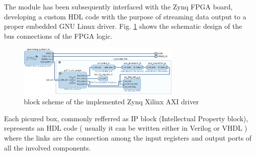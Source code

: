 The module has been subsequently interfaced with the Zynq FPGA board, developing a custom HDL code with the purpose of streaming data output to a proper embedded GNU Linux driver. Fig. \ref{fig:em_channel_hdl} shows the schematic design of the bus connections of the FPGA logic.
\begin{figure}[ht]
\centering
\includegraphics[width=0.7\textwidth]{img/4_EmbeddedML/7.png}
\caption{block scheme of the implemented Zynq Xilinx AXI driver}
\label{fig:em_channel_hdl}
\end{figure}
Each picured box, commonly refferred as IP block (Intellectual Property block), represents an HDL code ( usually it can be written either in Verilog or VHDL ) where the links are the connection among the input registers and output ports of all the involved components.
